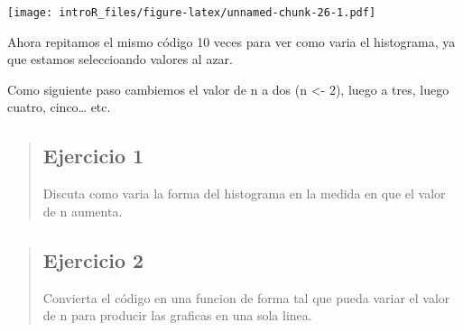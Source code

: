 \documentclass[
]{book}
\newenvironment{Shaded}{\begin{snugshade}}{\end{snugshade}}
\newcommand{\CommentTok}[1]{\textcolor[rgb]{0.56,0.35,0.01}{\textit{#1}}}
\newcommand{\ControlFlowTok}[1]{\textcolor[rgb]{0.13,0.29,0.53}{\textbf{#1}}}
\newcommand{\DataTypeTok}[1]{\textcolor[rgb]{0.13,0.29,0.53}{#1}}
\newcommand{\DecValTok}[1]{\textcolor[rgb]{0.00,0.00,0.81}{#1}}
\newcommand{\KeywordTok}[1]{\textcolor[rgb]{0.13,0.29,0.53}{\textbf{#1}}}
\newcommand{\NormalTok}[1]{#1}
\newcommand{\OperatorTok}[1]{\textcolor[rgb]{0.81,0.36,0.00}{\textbf{#1}}}
\newcommand{\OtherTok}[1]{\textcolor[rgb]{0.56,0.35,0.01}{#1}}
\newcommand{\StringTok}[1]{\textcolor[rgb]{0.31,0.60,0.02}{#1}}
\begin{document}
\begin{Shaded}
\end{Shaded}

\texttt{[image: introR\_files/figure-latex/unnamed-chunk-26-1.pdf]}

Ahora repitamos el mismo código 10 veces para ver como varia el histograma, ya que estamos seleccioando valores al azar.

Como siguiente paso cambiemos el valor de n a dos (n \textless- 2), luego a tres, luego cuatro, cinco\ldots{} etc.

\begin{quote}
\hypertarget{ejercicio-1-1}{%
\subsection{Ejercicio 1}\label{ejercicio-1-1}}

Discuta como varia la forma del histograma en la medida en que el valor de n aumenta.
\end{quote}

\begin{quote}
\hypertarget{ejercicio-2}{%
\subsection{Ejercicio 2}\label{ejercicio-2}}

Convierta el código en una funcion de forma tal que pueda variar el valor de n para producir las graficas en una sola linea.
\end{quote}
\end{document}
